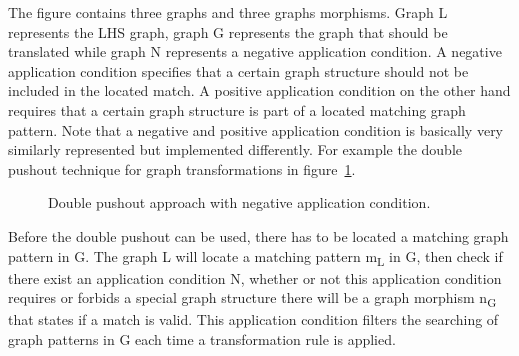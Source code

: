 The figure contains three graphs and three graphs morphisms. Graph L
represents the LHS graph, graph G represents the graph that should be
translated while graph N represents a negative application condition. A negative
application condition specifies that a certain graph structure should not be
included in the located match. A positive application condition on the other
hand requires that a certain graph structure is part of a located matching graph
pattern. Note that a negative and positive application condition is basically
very similarly represented but implemented differently. For example the double
pushout technique for graph transformations in figure~\ref{fig:DPO_NAC}. 

\begin{figure}[H]
	\centering
	\caption[The Double Pushout approach with NAC]
	{Double pushout approach with negative application condition.}
	\label{fig:DPO_NAC}
\end{figure}

Before the double pushout can be used, there has to be located a matching graph
pattern in G. The graph L will locate a matching pattern m\textsubscript{L} in
G, then check if there exist an application condition N, whether or not this application
condition requires or forbids a special graph structure there will be a graph
morphism n\textsubscript{G} that states if a match is valid. This application
condition filters the searching of graph patterns in G each time a
transformation rule is applied. 





